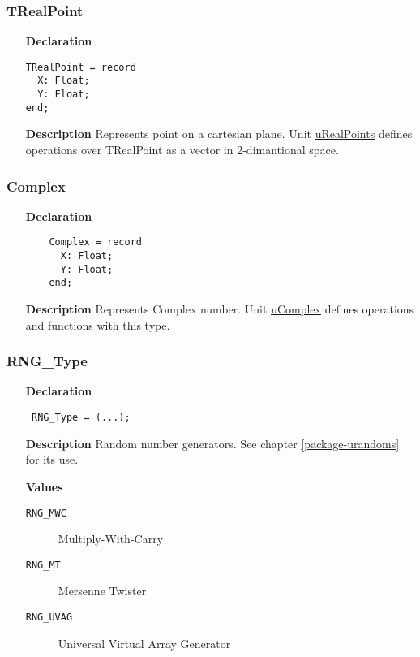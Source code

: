 \documentclass[12pt,a4paper,oneside]{report}
\newcommand{\lmath}[1]{   %
	\marginpar{\vspace{#1} 
		\begin{flushright}
			LMath
	\end{flushright} }
}
\newcommand{\declarationitem}[1]{\textbf{#1}}
\newcommand{\descriptiontitle}[1]{\textbf{#1}}
\newcommand{\code}[1]{\texttt{#1}}
\begin{document}
\subsubsection{TRealPoint}\label{types:trealpoint}
\lmath{-24pt}
\begin{itemize}
	\item[\declarationitem{Declaration}\hfill]

\begin{verbatim}
TRealPoint = record
  X: Float;
  Y: Float;
end;
\end{verbatim}
\item[\descriptiontitle{Description}]
Represents point on a cartesian plane. Unit \hyperref[uRealPoints]{uRealPoints} defines operations over TRealPoint as a vector in 2-dimantional space.
\end{itemize}
\subsubsection{Complex}\label{utypes-complex}
\begin{itemize}
	\item[\declarationitem{Declaration}\hfill]
	\begin{verbatim}
	Complex = record
	  X: Float;
	  Y: Float;
	end;
	\end{verbatim}
	\item[\descriptiontitle{Description}]
Represents Complex number. Unit \hyperref[ucomplex]{uComplex} defines operations and functions with this type.
\end{itemize}
\subsubsection{RNG{\_}Type}
\label{utypes-RNG_Type}
\begin{itemize}\item[\declarationitem{Declaration}\hfill]
	\begin{flushleft}
		\code{
			RNG{\_}Type = (...);}
		
	\end{flushleft}
	
	\par
	\item[\descriptiontitle{Description}]
	Random number generators. See chapter \ref{package-urandoms} for its use.
	\item[\textbf{Values}]
	\begin{description}
		\item[\texttt{RNG{\_}MWC}] Multiply{-}With{-}Carry
		\item[\texttt{RNG{\_}MT}] Mersenne Twister
		\item[\texttt{RNG{\_}UVAG}] Universal Virtual Array Generator
	\end{description}
\end{itemize}
\end{document}
